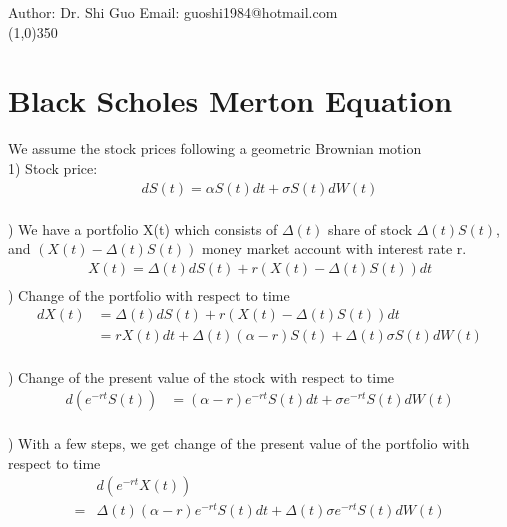 \documentclass[a4paper]{article}
\begin{document}
Author: Dr. Shi Guo  \hspace{30mm} Email: guoshi1984@hotmail.com\\
\line(1,0){350}
\section{Black Scholes Merton Equation}
We assume the stock prices following a geometric Brownian motion\\
1) Stock price:\\
\begin{align*}
	 dS(t) = \alpha S(t) dt + \sigma S(t) dW(t)\\
\end{align*}
 
) We have a portfolio X(t) which consists of $\Delta(t)$ share of stock  $\Delta(t) S(t)$, and $(X(t) - \Delta (t) S(t))$ money market account with interest rate r. \\  
\begin{align*}
	X(t) = \Delta(t) dS(t) + r(X(t) -\Delta(t) S(t)) dt\\
\end{align*}
) Change of the portfolio with respect to time
\begin{align*}
	  d X(t) & = \Delta(t) d S(t) + r(X(t) - \Delta(t) S(t)) dt \\
             & = r X(t) dt + \Delta(t) (\alpha - r )S(t) + \Delta (t) \sigma S(t) d W(t) \\
\end{align*}
                      
) Change of the present value of the stock with respect to time\\
\begin{align*}
	d(e^{-r t} S(t)) & = (\alpha - r) e^{- r t}S(t) dt + \sigma e^{- r t} S(t) dW(t) \\
\end{align*}

) With a few steps, we get change of the present value of the portfolio with respect to time\\
\begin{align*}
 & d(e^{- r t} X(t)) \\
 = & \Delta(t) (\alpha - r) e^{-rt} S(t) dt + \Delta(t) \sigma e^{-rt} S(t) dW(t)\\
\end{align*}
\end{document}
